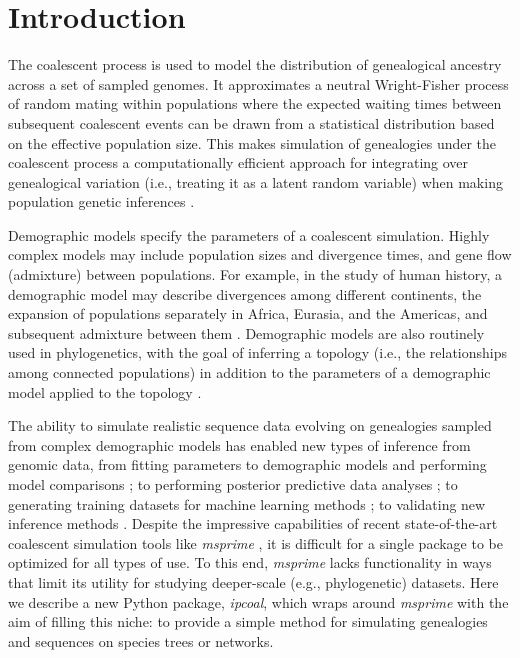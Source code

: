 \documentclass[11pt]{article}
\begin{document}
\RaggedRight
\bigskip

\section{Introduction}
The coalescent process \citep{hudson_testing_1983,kingman_coalescent_1982} is used to model the distribution of genealogical ancestry across a set of sampled genomes. It approximates a neutral Wright-Fisher process of random mating within populations where the expected waiting times between subsequent coalescent events can be drawn from a statistical distribution based on the effective population size. This makes simulation of genealogies under the coalescent process \citep{hudson_generating_2002} a computationally efficient approach for integrating over genealogical variation (i.e., treating it as a latent random variable) when making population genetic inferences \citep{beerli_coalescent_2001}. 

Demographic models specify the parameters of a coalescent simulation. Highly complex models may include population sizes and divergence times, and gene flow (admixture) between populations. For example, in the study of human history, a demographic model may describe divergences among different continents, the expansion of populations separately in Africa, Eurasia, and the Americas, and subsequent admixture between them \citep{reich_who_2018,gronau_demography_2011,green_neandertal_2010}. Demographic models are also routinely used in phylogenetics, with the goal of inferring a topology (i.e., the relationships among connected populations) in addition to the parameters of a demographic model applied to the topology \citep{knowles_estimating_2011,degnan_gene_2009}. 

The ability to simulate realistic sequence data evolving on genealogies sampled from complex demographic models has enabled new types of inference from genomic data, from fitting parameters to demographic models and performing model comparisons \citep{chung_bayesian_2017}; to performing posterior predictive data analyses \citep{brown_predictive_2014}; to generating training datasets for machine learning methods \citep{schrider_learning_2017}; to validating new inference methods \citep{adrion_community_maintained_2019}. Despite the impressive capabilities of recent state-of-the-art coalescent simulation tools like \emph{msprime} \citep{kelleher_efficient_2016}, it is difficult for a single package to be optimized for all types of use. To this end, \emph{msprime} lacks functionality in ways that limit its utility for studying deeper-scale (e.g., phylogenetic) datasets. Here we describe a new Python package, \emph{ipcoal}, which wraps around \emph{msprime} with the aim of filling this niche: to provide a simple method for simulating genealogies and sequences on species trees or networks.
\end{document}
